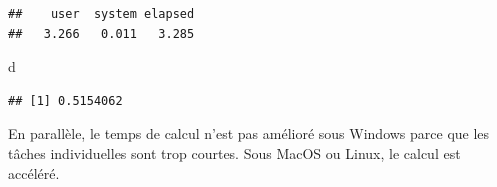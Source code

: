 \documentclass[
  12pt,
  french,
  a4paper,
  extrafontsizes,onecolumn,openright
  ]{memoir}
\newenvironment{Shaded}{\begin{snugshade}}{\end{snugshade}}
\newcommand{\ControlFlowTok}[1]{\textcolor[rgb]{0.13,0.29,0.53}{\textbf{#1}}}
\newcommand{\DecValTok}[1]{\textcolor[rgb]{0.00,0.00,0.81}{#1}}
\newcommand{\KeywordTok}[1]{\textcolor[rgb]{0.13,0.29,0.53}{\textbf{#1}}}
\newcommand{\NormalTok}[1]{#1}
\newcommand{\OperatorTok}[1]{\textcolor[rgb]{0.81,0.36,0.00}{\textbf{#1}}}
\newcommand{\StringTok}[1]{\textcolor[rgb]{0.31,0.60,0.02}{#1}}
\begin{document}
\begin{verbatim}
##    user  system elapsed 
##   3.266   0.011   3.285
\end{verbatim}

\begin{Shaded}
\begin{Highlighting}[]
\NormalTok{d}
\end{Highlighting}
\end{Shaded}

\begin{verbatim}
## [1] 0.5154062
\end{verbatim}

\normalsize

En parallèle, le temps de calcul n'est pas amélioré sous Windows parce que les tâches individuelles sont trop courtes.
Sous MacOS ou Linux, le calcul est accéléré.

\scriptsize

\begin{Shaded}
\end{Shaded}
\end{document}
